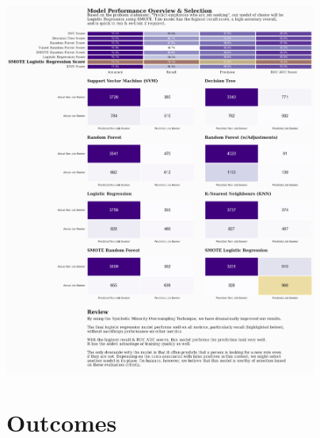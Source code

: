 \begin{center}
\includegraphics[width=0.77\textwidth]{download-3}
\end{center}

\pagebreak

\section{Outcomes}

